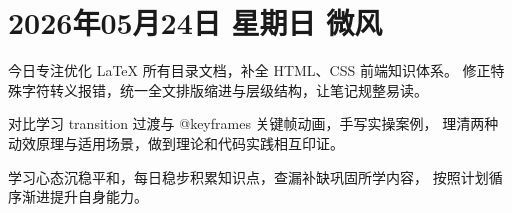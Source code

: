 \section*{2026年05月24日 \quad 星期日 \quad 微风}

今日专注优化 LaTeX 所有目录文档，补全 HTML、CSS 前端知识体系。
修正特殊字符转义报错，统一全文排版缩进与层级结构，让笔记规整易读。

对比学习 transition 过渡与 @keyframes 关键帧动画，手写实操案例，
理清两种动效原理与适用场景，做到理论和代码实践相互印证。

学习心态沉稳平和，每日稳步积累知识点，查漏补缺巩固所学内容，
按照计划循序渐进提升自身能力。
